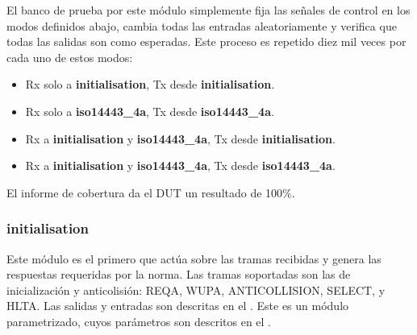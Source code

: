 \documentclass[a4paper, twoside, 11pt]{report}
\begin{document}
El banco de prueba por este módulo simplemente fija las señales de control en los modos definidos abajo, cambia todas las entradas aleatoriamente y verifica que todas las salidas son como esperadas. Este proceso es repetido diez mil veces por cada uno de estos modos:

\begin{itemize}
  \item Rx solo a \textbf{initialisation}, Tx desde \textbf{initialisation}.
  \item Rx solo a \textbf{iso14443\_4a}, Tx desde \textbf{iso14443\_4a}.
  \item Rx a \textbf{initialisation} y \textbf{iso14443\_4a}, Tx desde \textbf{initialisation}.
  \item Rx a \textbf{initialisation} y \textbf{iso14443\_4a}, Tx desde \textbf{iso14443\_4a}.
\end{itemize}

El informe de cobertura da el DUT un resultado de 100\%.

\FloatBarrier
\subsubsection{initialisation}
\label{sec:initialisation}

Este módulo es el primero que actúa sobre las tramas recibidas y genera las respuestas requeridas por la norma. Las tramas soportadas son las de inicialización y anticolisión: REQA, WUPA, ANTICOLLISION, SELECT, y HLTA. Las salidas y entradas son descritas en el . Este es un módulo parametrizado, cuyos parámetros son descritos en el .
\end{document}
